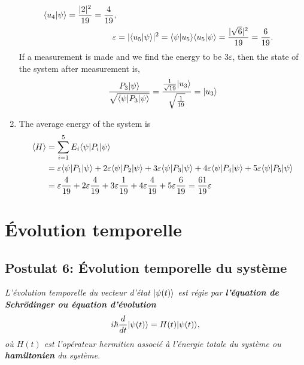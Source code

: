 \begin{footnotesize}
\begin{solution}
\begin{enumerate}
\begin{subequations}
\begin{align}
 \langle u_4\vert\psi\rangle=\frac{|2|^2}{19}=\frac{4}{19},\\
 \mathcal{\varepsilon} &=|\langle u_5\vert\psi\rangle|^{2}=\langle\psi\vert u_5\rangle
 \langle u_5\vert\psi\rangle=\frac{|\sqrt{6}|^2}{19}=\frac{6}{19}.
\end{align}
\end{subequations}
If a measurement is made and we find the energy to be $3\varepsilon$, then the
state of the system after measurement is,
\begin{equation}
 \frac{P_3 \vert\psi\rangle}{\sqrt{\langle\psi\vert P_3\vert\psi\rangle}}
=\frac{\frac{1}{\sqrt{19}}\vert u_3\rangle}{\sqrt{\frac{1}{19}}}=\vert u_3\rangle
\end{equation}
\item  The average energy of the system is
\begin{equation}
 \begin{split}
\langle H\rangle & =\sum_{i=1}^{5}E_i \langle\psi\vert P_i \vert\psi\rangle\\
 & =\varepsilon\langle\psi\vert P_1 \vert\psi\rangle+2\varepsilon\langle\psi\vert P_2
\vert\psi\rangle+3\varepsilon\langle\psi\vert P_3 \vert\psi\rangle+4\varepsilon\langle\psi\vert P_4
\vert\psi\rangle+5\varepsilon\langle\psi\vert P_5 \vert\psi\rangle\\
& = \varepsilon\frac{4}{19}+2\varepsilon\frac{4}{19}+3\varepsilon\frac{1}{19}
+4\varepsilon\frac{4}{19}+5\varepsilon\frac{6}{19} = \frac{61}{19}\varepsilon
\end{split}
\end{equation}
\end{enumerate}

\end{solution}
\end{footnotesize}

\section{Évolution temporelle}

\label{sec:EvolTempo}

\subsection{Postulat 6: Évolution temporelle du système}

\colorbox[gray]{0.8}{
\parbox[c]{0.9\textwidth}{
\emph{L'évolution temporelle du vecteur d'état $\vert\psi(t)\rangle$ est régie par
\textbf{l'équation de Schrödinger ou équation d'évolution}}%
\begin{equation}
i\hbar\frac{d}{dt}\ket{\psi(t)}=H(t)\ket{\psi(t)},
\label{EqSch1}%
\end{equation}
\emph{où $H(t)$ est l'opérateur hermitien associé à l'énergie totale du système
ou \textbf{hamiltonien} du système}.
}}
\medskip

